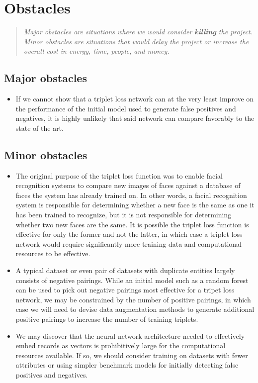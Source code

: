 \documentclass{proc}
\begin{document}
\section{Obstacles}
\begin{quote}
\emph{Major obstacles are situations where we would consider \textbf{killing} the project. 
Minor obstacles are situations that would delay the project or increase the overall cost in energy, time, people, and money.}
\end{quote}

\subsection{Major obstacles} 

\begin{itemize}
  \item If we cannot show that a triplet loss network can at the very least improve on the performance of the initial model used to generate false positives and negatives, it is highly unlikely that said network can compare favorably to the state of the art.
\end{itemize}

\subsection{Minor obstacles}

\begin{itemize}
  \item The original purpose of the triplet loss function was to enable facial recognition systems to compare new images of faces against a database of faces the system has already trained on. In other words, a facial recognition system is responsible for determining whether a new face is the same as one it has been trained to recognize, but it is not responsible for determining whether two new faces are the same. It is possible the triplet loss function is effective for only the former and not the latter, in which case a triplet loss network would require significantly more training data and computational resources to be effective.
  \item A typical dataset or even pair of datasets with duplicate entities largely consists of negative pairings. While an initial model such as a random forest can be used to pick out negative pairings most effective for a tripet loss network, we may be constrained by the number of positive pairings, in which case we will need to devise data augmentation methods to generate additional positive pairings to increase the number of training triplets.
  \item We may discover that the neural network architecture needed to effectively embed records as vectors is prohibitively large for the computational resources available. If so, we should consider training on datasets with fewer attributes or using simpler benchmark models for initially detecting false positives and negatives.
\end{itemize}
\end{document}
